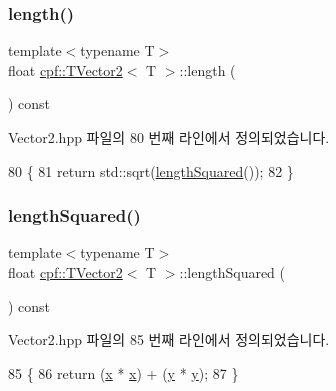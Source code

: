 \subsubsection{\texorpdfstring{length()}{length()}}
{\footnotesize\ttfamily template$<$typename T$>$ \\
float \hyperlink{classcpf_1_1_t_vector2}{cpf\+::\+T\+Vector2}$<$ T $>$\+::length (\begin{DoxyParamCaption}{ }\end{DoxyParamCaption}) const\hspace{0.3cm}{\ttfamily [inline]}}



Vector2.\+hpp 파일의 80 번째 라인에서 정의되었습니다.


\begin{DoxyCode}
80                              \{
81             \textcolor{keywordflow}{return} std::sqrt(\hyperlink{classcpf_1_1_t_vector2_a4e7d459775330c569777ede3b1424483}{lengthSquared}());
82         \}
\end{DoxyCode}
\mbox{\label{classcpf_1_1_t_vector2_a4e7d459775330c569777ede3b1424483}} 
\subsubsection{\texorpdfstring{length\+Squared()}{lengthSquared()}}
{\footnotesize\ttfamily template$<$typename T$>$ \\
float \hyperlink{classcpf_1_1_t_vector2}{cpf\+::\+T\+Vector2}$<$ T $>$\+::length\+Squared (\begin{DoxyParamCaption}{ }\end{DoxyParamCaption}) const\hspace{0.3cm}{\ttfamily [inline]}}



Vector2.\+hpp 파일의 85 번째 라인에서 정의되었습니다.


\begin{DoxyCode}
85                                     \{
86             \textcolor{keywordflow}{return} (\hyperlink{classcpf_1_1_t_vector2_a2c0ac9258353351f1435070a2307e9e1}{x} * \hyperlink{classcpf_1_1_t_vector2_a2c0ac9258353351f1435070a2307e9e1}{x}) + (\hyperlink{classcpf_1_1_t_vector2_a727b923b39a876bbb13c810bcf6eecff}{y} * \hyperlink{classcpf_1_1_t_vector2_a727b923b39a876bbb13c810bcf6eecff}{y});
87         \}
\end{DoxyCode}
\mbox{\label{classcpf_1_1_t_vector2_ab41c170e54eefd9a658168d1f8b729b3}} 

